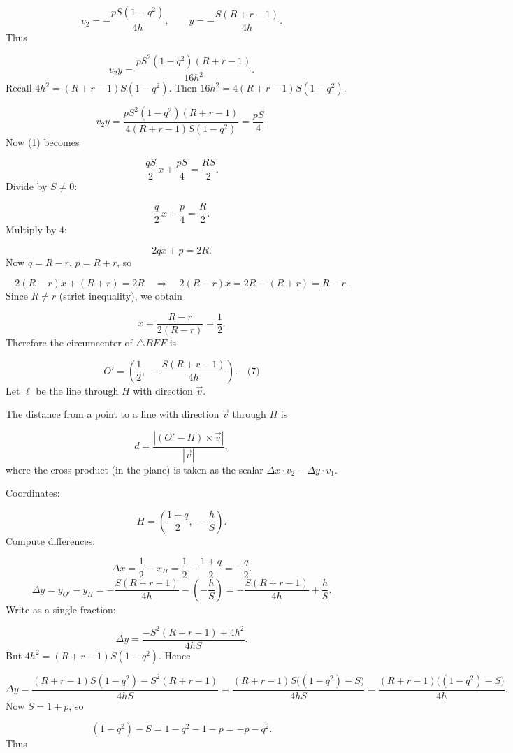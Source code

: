 \[
v_2 = -\frac{p S (1 - q^2)}{4h},\qquad y = -\frac{S (R+r-1)}{4h}.
\]
Thus\par
\[
v_2 y = \frac{p S^2 (1 - q^2) (R+r-1)}{16 h^2}.
\]
Recall \(4h^2 = (R+r-1) S (1 - q^2)\). Then \(16 h^2 = 4 (R+r-1) S (1 - q^2)\).\par
\[
v_2 y = \frac{p S^2 (1 - q^2) (R+r-1)}{4 (R+r-1) S (1 - q^2)} = \frac{p S}{4}.
\]
Now (1) becomes\par
\[
\frac{q S}{2}\, x + \frac{p S}{4} = \frac{R S}{2}.
\]
Divide by \(S \neq 0\):\par
\[
\frac{q}{2}\, x + \frac{p}{4} = \frac{R}{2}.
\]
Multiply by \(4\):\par
\[
2q x + p = 2R.
\]
Now \(q = R - r\), \(p = R + r\), so\par
\[
2(R - r) x + (R + r) = 2R
\quad\Longrightarrow\quad 2(R - r) x = 2R - (R + r) = R - r.
\]
Since \(R \neq r\) (strict inequality), we obtain\par
\[
x = \frac{R - r}{2(R - r)} = \frac12.
\]
Therefore the circumcenter of \(\triangle BEF\) is\par
\[
O' = \left(\frac12,\; -\frac{S (R+r-1)}{4h}\right). \quad\text{(7)}
\]
Let \(\ell\) be the line through \(H\) with direction \(\vec{v}\).\par
The distance from a point to a line with direction \(\vec{v}\) through \(H\) is\par
\[
d = \frac{|(O' - H) \times \vec{v}|}{|\vec{v}|},
\]
where the cross product (in the plane) is taken as the scalar \(\Delta x\cdot v_2 - \Delta y\cdot v_1\).\par
Coordinates:\par
\[
H = \left(\frac{1+q}{2},\; -\frac{h}{S}\right).
\]
Compute differences:\par
\[
\Delta x = \frac12 - x_H = \frac12 - \frac{1+q}{2} = -\frac{q}{2}.
\]
\[
\Delta y = y_{O'} - y_H = -\frac{S (R+r-1)}{4h} - \left(-\frac{h}{S}\right) = -\frac{S (R+r-1)}{4h} + \frac{h}{S}.
\]
Write as a single fraction:\par
\[
\Delta y = \frac{ -S^2 (R+r-1) + 4h^2 }{4h S}.
\]
But \(4h^2 = (R+r-1) S (1 - q^2)\). Hence\par
\[
\Delta y = \frac{ (R+r-1) S (1 - q^2) - S^2 (R+r-1) }{4h S}
= \frac{ (R+r-1) S \bigl( (1 - q^2) - S \bigr)}{4h S}
= \frac{ (R+r-1) \bigl( (1 - q^2) - S \bigr)}{4h}.
\]
Now \(S = 1 + p\), so\par
\[
(1 - q^2) - S = 1 - q^2 - 1 - p = -p - q^2.
\]
Thus\par
